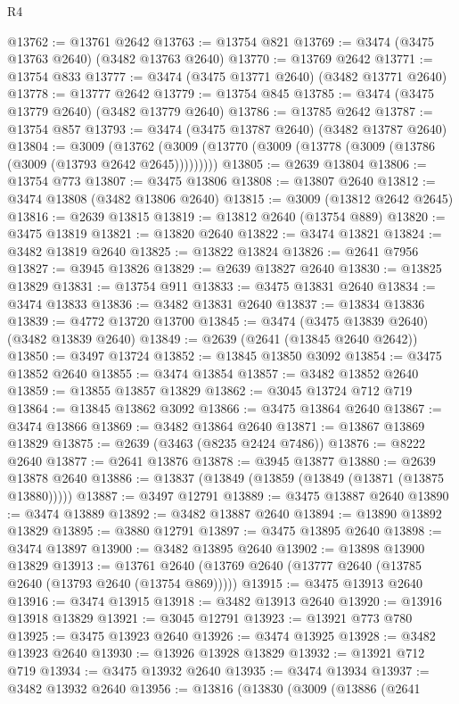 \begin{lexlean}{R4}
\begin{coremodule}
@13762 := @13761 @2642
@13763 := @13754 @821
@13769 := @3474 (@3475 @13763 @2640) (@3482 @13763 @2640)
@13770 := @13769 @2642
@13771 := @13754 @833
@13777 := @3474 (@3475 @13771 @2640) (@3482 @13771 @2640)
@13778 := @13777 @2642
@13779 := @13754 @845
@13785 := @3474 (@3475 @13779 @2640) (@3482 @13779 @2640)
@13786 := @13785 @2642
@13787 := @13754 @857
@13793 := @3474 (@3475 @13787 @2640) (@3482 @13787 @2640)
@13804 := @3009
    (@13762 (@3009 (@13770 (@3009 (@13778 (@3009 (@13786 (@3009 (@13793 @2642 @2645)))))))))
@13805 := @2639 @13804
@13806 := @13754 @773
@13807 := @3475 @13806
@13808 := @13807 @2640
@13812 := @3474 @13808 (@3482 @13806 @2640)
@13815 := @3009 (@13812 @2642 @2645)
@13816 := @2639 @13815
@13819 := @13812 @2640 (@13754 @889)
@13820 := @3475 @13819
@13821 := @13820 @2640
@13822 := @3474 @13821
@13824 := @3482 @13819 @2640
@13825 := @13822 @13824
@13826 := @2641 @7956
@13827 := @3945 @13826
@13829 := @2639 @13827 @2640
@13830 := @13825 @13829
@13831 := @13754 @911
@13833 := @3475 @13831 @2640
@13834 := @3474 @13833
@13836 := @3482 @13831 @2640
@13837 := @13834 @13836
@13839 := @4772 @13720 @13700
@13845 := @3474 (@3475 @13839 @2640) (@3482 @13839 @2640)
@13849 := @2639 (@2641 (@13845 @2640 @2642))
@13850 := @3497 @13724
@13852 := @13845 @13850 @3092
@13854 := @3475 @13852 @2640
@13855 := @3474 @13854
@13857 := @3482 @13852 @2640
@13859 := @13855 @13857 @13829
@13862 := @3045 @13724 @712 @719
@13864 := @13845 @13862 @3092
@13866 := @3475 @13864 @2640
@13867 := @3474 @13866
@13869 := @3482 @13864 @2640
@13871 := @13867 @13869 @13829
@13875 := @2639 (@3463 (@8235 @2424 @7486))
@13876 := @8222 @2640
@13877 := @2641 @13876
@13878 := @3945 @13877
@13880 := @2639 @13878 @2640
@13886 := @13837 (@13849 (@13859 (@13849 (@13871 (@13875 @13880)))))
@13887 := @3497 @12791
@13889 := @3475 @13887 @2640
@13890 := @3474 @13889
@13892 := @3482 @13887 @2640
@13894 := @13890 @13892 @13829
@13895 := @3880 @12791
@13897 := @3475 @13895 @2640
@13898 := @3474 @13897
@13900 := @3482 @13895 @2640
@13902 := @13898 @13900 @13829
@13913 := @13761 @2640 (@13769 @2640 (@13777 @2640 (@13785 @2640 (@13793 @2640 (@13754 @869)))))
@13915 := @3475 @13913 @2640
@13916 := @3474 @13915
@13918 := @3482 @13913 @2640
@13920 := @13916 @13918 @13829
@13921 := @3045 @12791
@13923 := @13921 @773 @780
@13925 := @3475 @13923 @2640
@13926 := @3474 @13925
@13928 := @3482 @13923 @2640
@13930 := @13926 @13928 @13829
@13932 := @13921 @712 @719
@13934 := @3475 @13932 @2640
@13935 := @3474 @13934
@13937 := @3482 @13932 @2640
@13956 := @13816
    (@13830
      (@3009
        (@13886
          (@2641

\end{coremodule}
\end{lexlean}
